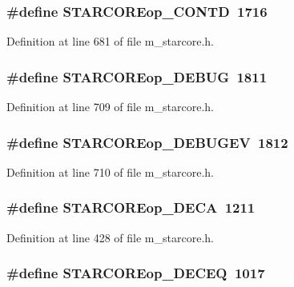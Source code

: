 \subsubsection{\setlength{\rightskip}{0pt plus 5cm}\#define STARCOREop\_\-CONTD~1716}\label{m__starcore_8h_b0459bbecccb097f3ac686494f135fc7}




Definition at line 681 of file m\_\-starcore.h.
\subsubsection{\setlength{\rightskip}{0pt plus 5cm}\#define STARCOREop\_\-DEBUG~1811}\label{m__starcore_8h_8c9e9c9f47fd55fee1f7882b5f8fd128}




Definition at line 709 of file m\_\-starcore.h.
\subsubsection{\setlength{\rightskip}{0pt plus 5cm}\#define STARCOREop\_\-DEBUGEV~1812}\label{m__starcore_8h_e9b28d027c3df3184f1ba4202a2d2a6c}




Definition at line 710 of file m\_\-starcore.h.
\subsubsection{\setlength{\rightskip}{0pt plus 5cm}\#define STARCOREop\_\-DECA~1211}\label{m__starcore_8h_de203358424dabf8a2b4821e7bf1807d}




Definition at line 428 of file m\_\-starcore.h.
\subsubsection{\setlength{\rightskip}{0pt plus 5cm}\#define STARCOREop\_\-DECEQ~1017}\label{m__starcore_8h_1ebbe108aff21f179dbf0aa3d01ce066}





